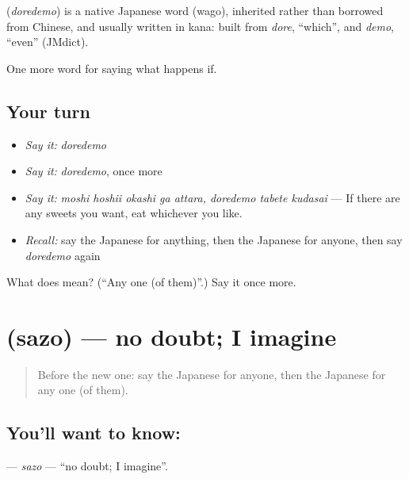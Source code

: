 \begin{cousinweb}
\textbf{} (\emph{doredemo}) is a native Japanese word (wago), inherited rather than borrowed from Chinese, and usually written in kana: built from \emph{dore}, \textquotedblleft{}which\textquotedblright{}, and \emph{demo}, \textquotedblleft{}even\textquotedblright{} (JMdict).
\end{cousinweb}

\begin{grammarlens}[title={What you've built}]
One more word for saying what happens if.
\end{grammarlens}

\subsection*{Your turn}
\begin{itemize}
\raggedright
  \item \emph{Say it:} \emph{doredemo}
  \item \emph{Say it:} \emph{doredemo}, once more
  \item \emph{Say it:} \emph{moshi hoshii okashi ga attara, doredemo tabete kudasai} — If there are any sweets you want, eat whichever you like.
  \item \emph{Recall:} say the Japanese for anything, then the Japanese for anyone, then say \emph{doredemo} again
\end{itemize}

\begin{tcolorbox}[breakable,colback=teal!4,colframe=teal!35!black,title={Before you move on}]
What does  mean? (\textquotedblleft{}Any one (of them)\textquotedblright{}.) Say it once more.
\end{tcolorbox}
\section[\texorpdfstring{\ja{さぞ} (sazo)}{さぞ (sazo)}]{ (sazo) — no doubt; I imagine}

\label{lesson:JA-C523-sazo}



\begin{quote}
Before the new one: say the Japanese for anyone, then the Japanese for any one (of them).
\end{quote}

\subsection*{You'll want to know: }
\textbf{} — \emph{sazo} — \textquotedblleft{}no doubt; I imagine\textquotedblright{}.

